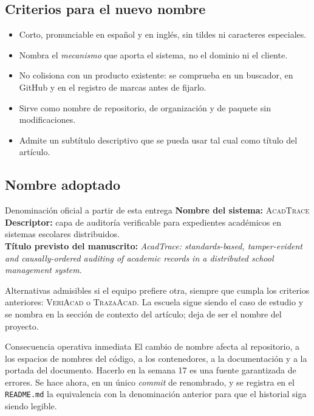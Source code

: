 \documentclass[11pt,a4paper]{article}
\begin{document}
\subsection{Criterios para el nuevo nombre}

\begin{itemize}[leftmargin=*,itemsep=3pt]
	\item Corto, pronunciable en español y en inglés, sin tildes ni caracteres especiales.
	\item Nombra el \emph{mecanismo} que aporta el sistema, no el dominio ni el cliente.
	\item No colisiona con un producto existente: se comprueba en un buscador, en GitHub y en el registro de marcas antes de fijarlo.
	\item Sirve como nombre de repositorio, de organización y de paquete sin modificaciones.
	\item Admite un subtítulo descriptivo que se pueda usar tal cual como título del artículo.
\end{itemize}

\subsection{Nombre adoptado}

\begin{aviso}{Denominación oficial a partir de esta entrega}
	\textbf{Nombre del sistema:} \textsc{AcadTrace}\\[6pt]
	\textbf{Descriptor:} capa de auditoría verificable para expedientes académicos en sistemas escolares distribuidos.\\[6pt]
	\textbf{Título previsto del manuscrito:} \emph{AcadTrace: standards-based, tamper-evident and causally-ordered auditing of academic records in a distributed school management system}.
\end{aviso}

Alternativas admisibles si el equipo prefiere otra, siempre que cumpla los criterios anteriores: \textsc{VeriAcad} o \textsc{TrazaAcad}. La escuela sigue siendo el caso de estudio y se nombra en la sección de contexto del artículo; deja de ser el nombre del proyecto.

\begin{alerta}{Consecuencia operativa inmediata}
	El cambio de nombre afecta al repositorio, a los espacios de nombres del código, a los contenedores, a la documentación y a la portada del documento. Hacerlo en la semana 17 es una fuente garantizada de errores. Se hace ahora, en un único \emph{commit} de renombrado, y se registra en el \texttt{README.md} la equivalencia con la denominación anterior para que el historial siga siendo legible.
\end{alerta}
\end{document}
